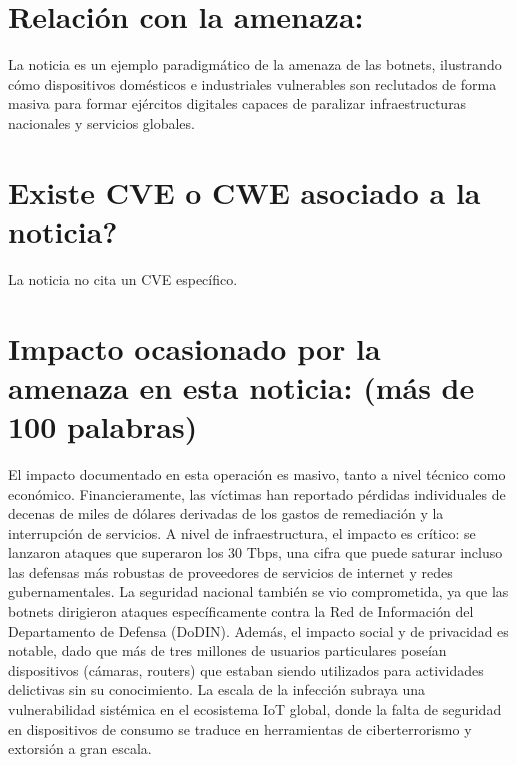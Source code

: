     \section{Relación con la amenaza:}
    La noticia es un ejemplo paradigmático de la amenaza de las botnets, ilustrando cómo dispositivos domésticos e industriales vulnerables son reclutados de forma masiva para formar ejércitos digitales capaces de paralizar infraestructuras nacionales y servicios globales.

    \section{\textquestiondown Existe CVE o CWE asociado a la noticia?}
    La noticia no cita un CVE específico.

    \section{Impacto ocasionado por la amenaza en esta noticia: (más de 100 palabras)}
    El impacto documentado en esta operación es masivo, tanto a nivel técnico como económico. Financieramente, las víctimas han reportado pérdidas individuales de decenas de miles de dólares derivadas de los gastos de remediación y la interrupción de servicios. A nivel de infraestructura, el impacto es crítico: se lanzaron ataques que superaron los 30 Tbps, una cifra que puede saturar incluso las defensas más robustas de proveedores de servicios de internet y redes gubernamentales. La seguridad nacional también se vio comprometida, ya que las botnets dirigieron ataques específicamente contra la Red de Información del Departamento de Defensa (DoDIN). Además, el impacto social y de privacidad es notable, dado que más de tres millones de usuarios particulares poseían dispositivos (cámaras, routers) que estaban siendo utilizados para actividades delictivas sin su conocimiento. La escala de la infección subraya una vulnerabilidad sistémica en el ecosistema IoT global, donde la falta de seguridad en dispositivos de consumo se traduce en herramientas de ciberterrorismo y extorsión a gran escala.